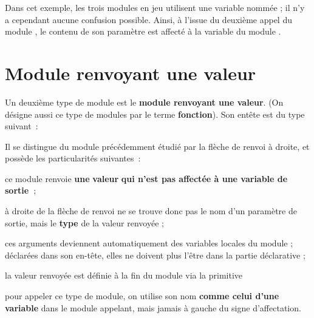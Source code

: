 	Dans cet exemple, les trois modules en jeu utilisent 
	une variable nommée ; 
	il n’y a cependant aucune confusion possible. 
	Ainsi, à l’issue du deuxième appel du module
	, 
	le contenu de son paramètre 
	est affecté à la variable 
	du module .

\section{Module renvoyant une valeur}

	Un deuxième type de module est le 
	\textbf{module renvoyant une valeur}. 
	(On désigne aussi ce type de modules par le terme \textbf{fonction}).
	Son entête est du type suivant~:


	Il se distingue du module précédemment étudié par la flèche de renvoi à
	droite, et possède les particularités suivantes~:

	\begin{liste}
	\item {
		{ce module renvoie
		}{\textbf{une}}{
		}{\textbf{valeur}}{
		}{\textbf{qui n’est pas affectée à une variable
		de
		}}{\textbf{sortie~}}{;}}
	\item {
		{à droite de la flèche de renvoi ne se trouve
		donc pas le nom d’un paramètre de sortie, mais le
		}{\textbf{type}}{ de la
		valeur renvoyée ;}}
	\item {
		}
	\item {
		}
	\item {
		ces arguments deviennent automatiquement des variables locales du module
		; déclarées dans son en-tête, elles ne doivent plus l’être dans la
		partie déclarative ;}
	\item {
		{la valeur renvoyée est définie à la fin du
		module via la primitive
		}}
	\item {
		pour appeler ce type de module, on utilise son nom \textbf{comme celui
		d’une variable} dans le module appelant, mais jamais à gauche du signe
		d’affectation.}
	\end{liste}

